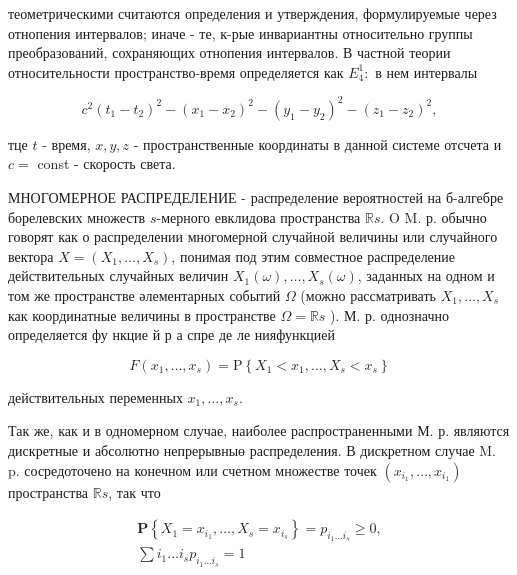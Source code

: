 \documentclass[10pt]{article}
\begin{document}
теометрическими считаются определения и утверждения, формулируемые через отнопения интервалов; иначе - те, к-рые инвариантны относительно группы преобразований, сохраняющих отнопения интервалов. В частной теории относительности пространство-время определяется как $E_{4}^{1}:$ в нем интервалы



\[

c^{2}\left(t_{1}-t_{2}\right)^{2}-\left(x_{1}-x_{2}\right)^{2}-\left(y_{1}-y_{2}\right)^{2}-\left(z_{1}-z_{2}\right)^{2},

\]



тце $t$ - время, $x, y, z$ - пространственные координаты в данной системе отсчета и $c=$ const - скорость света.



МНОГОМЕРНОЕ РАСПРЕДЕЛЕНИЕ - распределение вероятностей на б-алгебре борелевских множеств $s$-мерного евклидова пространства $\mathbb{R} s$. O M. р. обычно говорят как о распределении многомерной случайной величины или случайного вектора $X=\left(X_{1}, \ldots, X_{s}\right)$, понимая под этим совместное распределение действительных случайных величин $X_{1}(\omega), \ldots, X_{s}(\omega)$, заданных на одном и том же пространстве әлементарных событий $\Omega$ (можно рассматривать $X_{1}, \ldots, X_{s}$ как координатные величины в пространстве $\Omega=\mathbb{R} s$ ). М. р. однозначно определяется фу нкцие й р а спре де ле нияфункцией



\[

F\left(x_{1}, \ldots, x_{s}\right)=\mathrm{P}\left\{X_{1}<x_{1}, \ldots, X_{s}<x_{s}\right\}

\]



действительных переменных $x_{1}, \ldots, x_{s}$.



Так же, как и в одномерном случае, наиболее распространенными М. р. являются дискретные и абсолютно непрерывныө распределения. В дискретном случае M. p. сосредоточено на конечном или счетном множестве точек $\left(x_{i_{1}}, \ldots, x_{i_{1}}\right)$ пространства $\mathbb{R} s$, так что



\[

\begin{gathered}

\mathbf{P}\left\{X_{1}=x_{i_{1}}, \ldots, X_{s}=x_{i_{s}}\right\}=p_{i_{1} \ldots i_{s}} \geqslant 0, \\

\sum i_{1} \ldots i_{s} p_{i_{1} \ldots i_{s}}=1

\end{gathered}

\]
\end{document}
